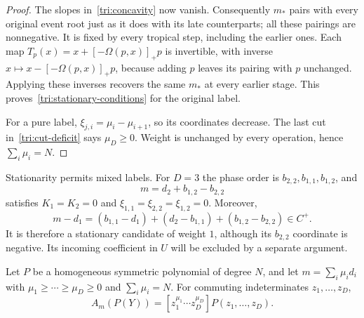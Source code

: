 \begin{proof}
The slopes in~\eqref{tri:concavity} now vanish.  Consequently $m_*$
pairs with every original event root just as it does with its late
counterparts; all these pairings are nonnegative.  It is fixed by
every tropical step, including the earlier ones.  Each map
$T_p(x)=x+[-\Omega(p,x)]_+p$ is invertible, with inverse
$x\mapsto x-[-\Omega(p,x)]_+p$, because adding $p$ leaves its pairing
with $p$ unchanged.  Applying these inverses recovers the same $m_*$
at every earlier stage.  This proves~\eqref{tri:stationary-conditions}
for the original label.

For a pure label, $\xi_{j,i}=\mu_i-\mu_{i+1}$, so its coordinates
decrease.  The last cut in~\eqref{tri:cut-deficit} says $\mu_D\geq0$.
Weight is unchanged by every operation, hence $\sum_i\mu_i=N$.
\end{proof}

\begin{example}\label{tri:mixed-stationary}
Stationarity permits mixed labels.  For $D=3$ the phase order is
$b_{2,2},b_{1,1},b_{1,2}$, and
\[
 m=d_2+b_{1,2}-b_{2,2}
\]
satisfies $K_1=K_2=0$ and
$\xi_{1,1}=\xi_{2,2}=\xi_{1,2}=0$.  Moreover,
\[
 m-d_1=(b_{1,1}-d_1)+(d_2-b_{1,1})+(b_{1,2}-b_{2,2})\in C^+.
\]
It is therefore a stationary candidate of weight $1$, although its
$b_{2,2}$ coordinate is negative.  Its incoming coefficient in $U$
will be excluded by a separate argument.
\end{example}

\begin{lemma}\label{tri:pure}
Let $P$ be a homogeneous symmetric polynomial of degree $N$, and let
$m=\sum_i\mu_i d_i$ with
$\mu_1\geq\cdots\geq\mu_D\geq0$ and $\sum_i\mu_i=N$.
For commuting indeterminates $z_1,\ldots,z_D$,
\begin{equation}\label{tri:pure-formula}
 A_m(P(Y))=[z_1^{\mu_1}\cdots z_D^{\mu_D}]P(z_1,\ldots,z_D).
\end{equation}
\end{lemma}

